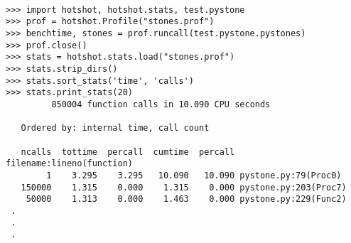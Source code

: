\begin{verbatim}

>>> import hotshot, hotshot.stats, test.pystone
>>> prof = hotshot.Profile("stones.prof")
>>> benchtime, stones = prof.runcall(test.pystone.pystones)
>>> prof.close()
>>> stats = hotshot.stats.load("stones.prof")
>>> stats.strip_dirs()
>>> stats.sort_stats('time', 'calls')
>>> stats.print_stats(20)
         850004 function calls in 10.090 CPU seconds

   Ordered by: internal time, call count

   ncalls  tottime  percall  cumtime  percall filename:lineno(function)
        1    3.295    3.295   10.090   10.090 pystone.py:79(Proc0)
   150000    1.315    0.000    1.315    0.000 pystone.py:203(Proc7)
    50000    1.313    0.000    1.463    0.000 pystone.py:229(Func2)
 .
 .
 .

\end{verbatim}


